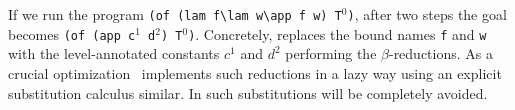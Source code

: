 \documentclass{llncs}
\begin{document}
If we run the program
\verb+(of (lam f\lam w\app f w) T+$^0$\verb+)+, after two steps the goal becomes
\verb+(of (app c+$^1$\verb+ d+$^2$\verb+) T+$^0$\verb+)+.
Concretely, \tedius{} replaces the bound names \verb+f+ and \verb+w+ with the level-annotated constants $c^1$ and $d^2$ performing the $\beta$-reductions.
As a crucial optimization~\cite{DBLP:journals/jar/LiangNQ04} \tedius{}
implements such reductions in a lazy way using an explicit substitution
calculus similar.
In \rff{} such substitutions will be completely avoided.

% 
% 
\end{document}

